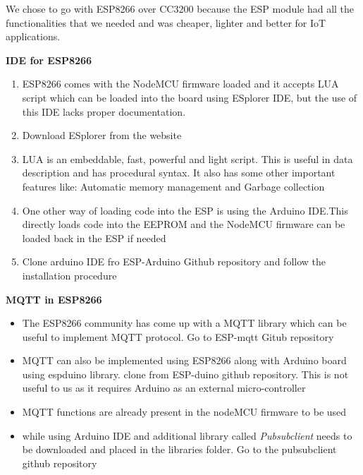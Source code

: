 \documentclass[16pt]{article}
\begin{document}
We chose to go with ESP8266 over CC3200 because the ESP module had all
the functionalities that we needed and was cheaper, lighter and better
for IoT applications.

\vspace{5.5cm}

{\LARGE{\textbf{IDE for ESP8266}}}

\begin{enumerate}

\item
  ESP8266 comes with the NodeMCU firmware loaded and it accepts LUA
  script which can be loaded into the board using ESplorer IDE, but the
  use of this IDE lacks proper documentation.
\item
  Download ESplorer from the website 
\item
  LUA is an embeddable, fast, powerful and light script. This is useful in data
  description and has procedural syntax. It also has some other
  important features like: Automatic memory management and Garbage
  collection
\item
  One other way of loading code into the ESP is using the Arduino
  IDE.This directly loads code into the EEPROM and the NodeMCU firmware
  can be loaded back in the ESP if
  needed
\item Clone
  arduino IDE fro ESP-Arduino Github repository and follow
  the installation procedure
\end{enumerate}

\vspace{0.5cm}

{\Large{\textbf{MQTT in ESP8266}}}

\begin{itemize}

\item
  The ESP8266 community has come up with a MQTT library which can be
  useful to implement MQTT protocol. Go to ESP-mqtt Gitub repository
 
\item
  MQTT can also be implemented using ESP8266 along with Arduino board
  using espduino library. clone from ESP-duino github repository. This is not
  useful to us as it requires Arduino as an external micro-controller
\item
  MQTT functions are already present in the nodeMCU firmware to be used
\item
  while using Arduino IDE and additional library called
  \emph{Pubsubclient} needs to be downloaded and placed in the libraries
  folder. Go to the pubsubclient github repository
\end{itemize}
\end{document}
